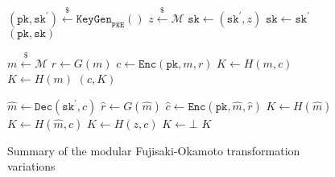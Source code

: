 \documentclass[floatrow,journal=tches,submission]{iacrtrans}
\newcommand{\pke}{\texttt{PKE}}
\newcommand{\keygen}{\texttt{KeyGen}}
\newcommand{\encrypt}{\texttt{Enc}}
\newcommand{\decrypt}{\texttt{Dec}}
\newcommand{\encap}{\texttt{Encap}}
\newcommand{\decap}{\texttt{Decap}}
\newcommand{\pk}{\texttt{pk}}
\newcommand{\sk}{\texttt{sk}}
\newcommand{\leftsample}{\stackrel{\$}{\leftarrow}}
\begin{document}
\begin{figure}[H]
    \centering
    \begin{minipage}{0.40\textwidth}
        \begin{algorithm}[H]
            \caption{$\keygen()$}\label{alg:fo-keygen}
            \begin{algorithmic}[1]
                \State $(\pk, \sk^\prime) \leftsample \keygen_\pke()$
                \State $z \leftsample \mathcal{M}$
                \State $\sk \leftarrow (\sk^\prime, z)$
                \State $\sk \leftarrow \sk^\prime$
                \State \Return $(\pk, \sk)$
            \end{algorithmic}
        \end{algorithm}
    \end{minipage}
    \hspace{0.05\textwidth}
    \begin{minipage}{0.45\textwidth}
        \begin{algorithm}[H]
            \caption{$\encap(\pk)$}\label{alg:fo-encap}
            \begin{algorithmic}[1]
                \State $m \leftsample \mathcal{M}$
                \State $r \leftarrow G(m)$
                \State $c \leftarrow \encrypt(\pk, m, r)$
                \State $K \leftarrow H(m, c)$
                \State $K \leftarrow H(m)$
                \State \Return $(c, K)$
            \end{algorithmic}
        \end{algorithm}
    \end{minipage}
    \vspace{0.5cm}
    \begin{minipage}{\textwidth}
        \begin{algorithm}[H]
            \caption{$\decap(\sk=(\sk^\prime, z), c)$}\label{alg:fo-decap}
            \begin{algorithmic}[1]
                \State $\hat{m} \leftarrow \decrypt(\sk^\prime, c)$
                \State $\hat{r} \leftarrow G(\hat{m})$
                \State $\hat{c} \leftarrow \encrypt(\pk, \hat{m}, \hat{r})$
                    \State $K \leftarrow H(\hat{m})$
                    \State $K \leftarrow H(\hat{m}, c)$
                \Else
                    \State $K \leftarrow H(z, c)$
                    \State $K \leftarrow \bot$
                \EndIf 
                \State \Return $K$
            \end{algorithmic}
        \end{algorithm}
    \end{minipage}
    \caption{Summary of the modular Fujisaki-Okamoto transformation variations}\label{fig:fo-routines}
\end{figure}
\end{document}
